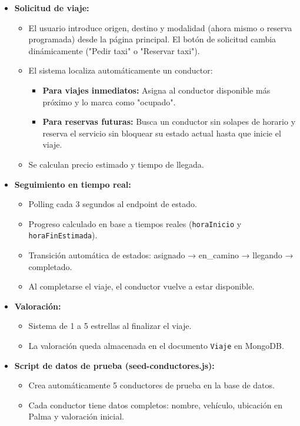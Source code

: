 \documentclass[12pt,a4paper]{article}
\begin{document}
\begin{itemize}
    \item \textbf{Solicitud de viaje:}
    \begin{itemize}
        \item El usuario introduce origen, destino y modalidad (ahora mismo o reserva programada) desde la página principal. El botón de solicitud cambia dinámicamente ("Pedir taxi" o "Reservar taxi").
        \item El sistema localiza automáticamente un conductor:
        \begin{itemize}
            \item \textbf{Para viajes inmediatos:} Asigna al conductor disponible más próximo y lo marca como "ocupado".
            \item \textbf{Para reservas futuras:} Busca un conductor sin solapes de horario y reserva el servicio sin bloquear su estado actual hasta que inicie el viaje.
        \end{itemize}
        \item Se calculan precio estimado y tiempo de llegada.
    \end{itemize}
    
    \item \textbf{Seguimiento en tiempo real:}
    \begin{itemize}
        \item Polling cada 3 segundos al endpoint de estado.
        \item Progreso calculado en base a tiempos reales (\texttt{horaInicio} y \texttt{horaFinEstimada}).
        \item Transición automática de estados: asignado → en\_camino → llegando → completado.
        \item Al completarse el viaje, el conductor vuelve a estar disponible.
    \end{itemize}
    
    \item \textbf{Valoración:}
    \begin{itemize}
        \item Sistema de 1 a 5 estrellas al finalizar el viaje.
        \item La valoración queda almacenada en el documento \texttt{Viaje} en MongoDB.
    \end{itemize}
    
    \item \textbf{Script de datos de prueba (seed-conductores.js):}
    \begin{itemize}
        \item Crea automáticamente 5 conductores de prueba en la base de datos.
        \item Cada conductor tiene datos completos: nombre, vehículo, ubicación en Palma y valoración inicial.
    \end{itemize}
\end{itemize}
\end{document}
